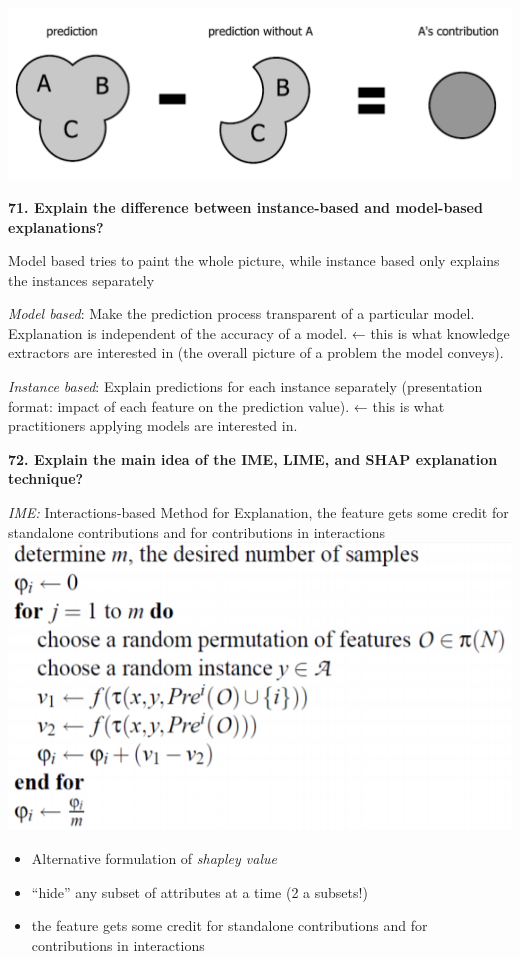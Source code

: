 \includegraphics[width=\columnwidth]{media/image6.png}

\textbf{71. Explain the difference between instance-based and
model-based explanations?}

Model based tries to paint the whole picture, while instance based only
explains the instances separately

\textit{Model based}: Make the prediction process transparent of a
particular model. Explanation is independent of the accuracy of a model.
← this is what knowledge extractors are interested in (the overall
picture of a problem the model conveys).

\textit{Instance based}: Explain predictions for each instance
separately (presentation format: impact of each feature on the
prediction value). ← this is what practitioners applying models are
interested in.

\textbf{72. Explain the main idea of the IME, LIME, and SHAP explanation
technique?}

\textit{IME:} Interactions-based Method for Explanation, the feature
gets some credit for standalone contributions and for contributions in
interactions
\includegraphics[width=\columnwidth]{media/image21.png}

\begin{itemize}
\item Alternative formulation of \emph{shapley value}
\item ``hide'' any subset of attributes at a time (2 a subsets!)
\item the feature gets some credit for standalone contributions and for contributions in interactions
\end{itemize}

